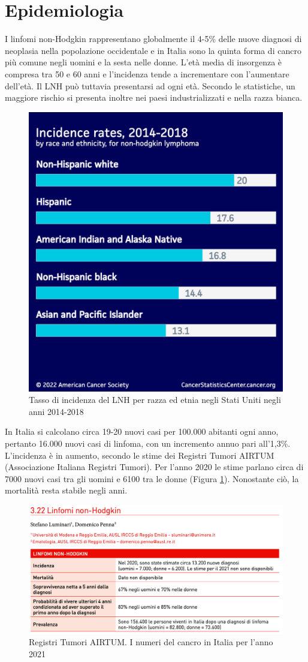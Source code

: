 \section{Epidemiologia}
I linfomi non-Hodgkin rappresentano globalmente il 4-5\% delle nuove diagnosi di neoplasia nella popolazione 
occidentale e in Italia sono la quinta forma di cancro più comune negli uomini e la sesta nelle donne\cite{AIOM}. 
L’età media di insorgenza è compresa tra 50 e 60 anni e l’incidenza tende a incrementare con l’aumentare dell’età. 
Il LNH può tuttavia presentarsi ad ogni età.
Secondo le statistiche, un maggiore rischio si presenta inoltre nei paesi industrializzati e nella razza 
bianca\cite{AMERICANCS}.

\begin{figure}[H]
    \begin{center}
    \includegraphics[width=0.3\columnwidth]{img/Incidencerates2014-18race-ethnicity.png}
    \vspace{-3mm}
    \end{center}
    \caption{Tasso di incidenza del LNH per razza ed etnia negli Stati Uniti negli anni 2014-2018
    \cite{Americanstatistic}}

\end{figure}

In Italia si calcolano circa 19-20 nuovi casi per 100.000 abitanti ogni anno, pertanto 16.000 nuovi casi di linfoma, 
con un incremento annuo pari all’1,3\%\cite{AIOM}.\\
L’incidenza è in aumento, secondo le stime dei Registri Tumori AIRTUM (Associazione Italiana Registri Tumori).
Per l’anno 2020 le stime parlano circa di 7000 nuovi casi tra gli uomini e 6100 tra le donne (Figura \ref{fig:FIGURE_2.3}). 
Nonostante ciò, la mortalità resta stabile negli anni\cite{AIRC}.

\begin{figure}[H]
    \begin{center}
    \includegraphics[width=0.5\columnwidth]{img/2021.png}
    \vspace{-3mm}
    \end{center}
    \caption{Registri Tumori AIRTUM. I numeri del cancro in Italia per l’anno 2021
    \cite{img4-6-7}}
    \label{fig:FIGURE_2.3}
\end{figure}

